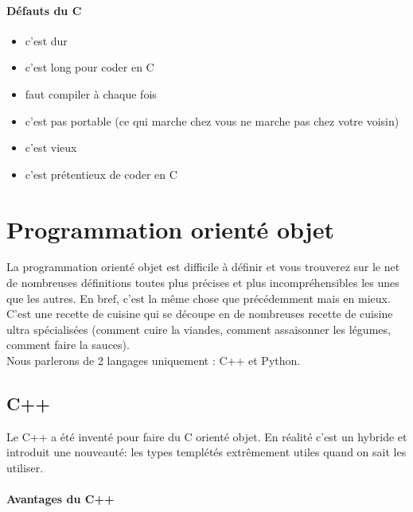 \paragraph{Défauts du C}

\begin{itemize}
\item c'est dur
\item c'est long pour coder en C
\item faut compiler à chaque fois
\item c'est pas portable (ce qui marche chez vous ne marche pas chez votre voisin)
\item c'est vieux
\item c'est prétentieux de coder en C
\end{itemize}

\section{Programmation orienté objet}

La programmation orienté objet est difficile à définir et vous trouverez sur le net de nombreuses 
définitions toutes plus précises et plus incompréhensibles les unes que les autres.
 En bref, c'est la même chose que précédemment mais en mieux. C'est une recette de cuisine qui se 
découpe en de nombreuses recette de cuisine ultra spécialisées (comment cuire la viandes,
 comment assaisonner les légumes, comment faire la sauces).\\


Nous parlerons de 2 langages uniquement : C++ et Python. 

\subsection{C++}

Le C++ a été inventé pour faire du C orienté objet. En réalité c'est un hybride et introduit une
nouveauté: les types templétés extrêmement utiles quand on sait les utiliser.


\paragraph{Avantages du C++}

